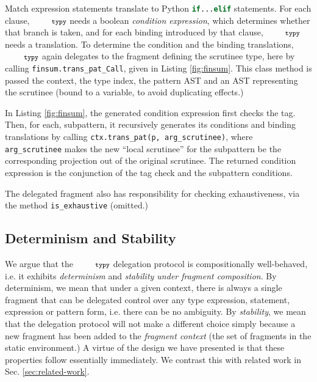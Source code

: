 \documentclass[10pt]{sigplanconf}
\newcommand{\typy}{\texttt{\footnotesize typy}}
\newcommand{\lip}[1]{\lstinline[language=Python,basicstyle=\ttfamily\footnotesize,morekeywords={with},deletendkeywords={tuple,buffer,map}]{#1}}
\newcommand{\li}[1]{\lip{#1}}
\begin{document}
Match expression statements translate to Python \li{if...elif} statements. For each clause, $\typy$ needs a boolean \emph{condition expression}, which determines whether that branch is taken, and for each binding introduced by that clause, $\typy$ needs a translation. To determine the condition and the binding translations, $\typy$ again delegates to the fragment defining the scrutinee type, here by calling \li{finsum.trans_pat_Call}, given in Listing \ref{fig:finsum}. This class method is passed the context, the type index, the pattern AST and an AST representing the scrutinee (bound to a variable, to avoid duplicating effects.) 

In Listing \ref{fig:finsum}, the generated condition expression first checks the tag. Then, for each, subpattern, it recursively generates its conditions and binding translations by calling \li{ctx.trans_pat(p, arg_scrutinee)}, where \li{arg_scrutinee} makes the new ``local scrutinee'' for the subpattern be the corresponding projection out of the original scrutinee. The returned condition expression is the conjunction of the tag check and the subpattern conditions. %

The delegated fragment also has responsibility for checking exhaustiveness, via the method \li{is_exhaustive} (omitted.) %

\subsection{Determinism and Stability}
We argue that the $\typy$ delegation protocol is compositionally well-behaved, i.e. it exhibits \emph{determinism} and \emph{stability under fragment composition}. By {determinism}, we mean that under a given context, there is always a single fragment that can be delegated control over any type expression, statement, expression or pattern form, i.e. there can be no ambiguity. By \emph{stability}, we mean that the delegation protocol will not make a different choice simply because a new fragment has been added to the \emph{fragment context} (the set of fragments in the static environment.) A virtue of the design we have presented is that these properties follow essentially immediately. We contrast this with related work in Sec. \ref{sec:related-work}.%
\end{document}

